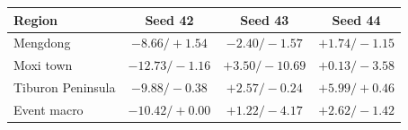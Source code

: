 \small
\begin{tabular}{lccc}
\toprule
Region & Seed 42 & Seed 43 & Seed 44 \\
\midrule
Mengdong & $-8.66/+1.54$ & $-2.40/-1.57$ & $+1.74/-1.15$ \\
Moxi town & $-12.73/-1.16$ & $+3.50/-10.69$ & $+0.13/-3.58$ \\
Tiburon Peninsula & $-9.88/-0.38$ & $+2.57/-0.24$ & $+5.99/+0.46$ \\
\midrule
Event macro & $-10.42/+0.00$ & $+1.22/-4.17$ & $+2.62/-1.42$ \\
\bottomrule
\end{tabular}
